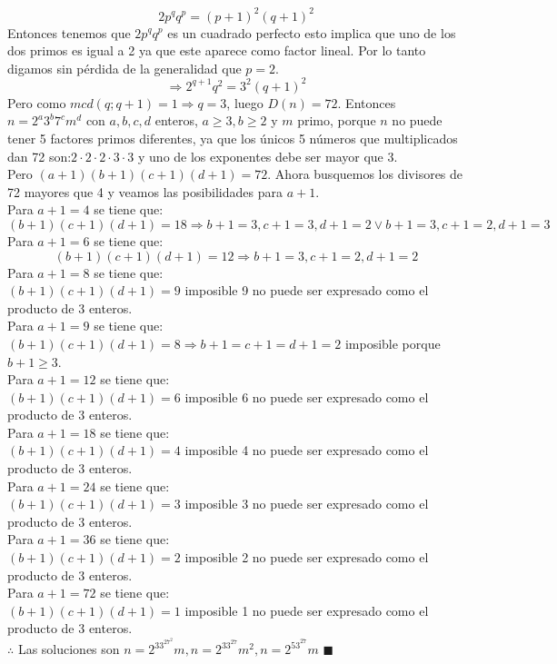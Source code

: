 \documentclass{book}
\begin{document}
\begin{enumerate}
$$2 p^qq^p = {(p + 1)}^2{(q + 1)}^2$$
 Entonces tenemos que $2 p^qq^p$ es un cuadrado perfecto esto implica  que uno de los dos primos es igual a 2 ya que este aparece como factor lineal. Por lo tanto digamos sin pérdida de la generalidad que $p= 2$.   
 $$\Rightarrow 2^{q+1}q^2 = 3^2(q + 1)^2$$ 
 Pero como $mcd(q;q + 1) = 1 \Rightarrow q = 3$, luego $D(n) = 72$. Entonces $n = 2^a3^b7^cm^d$ con $a,b,c,d$ enteros, $a \geq 3 ,b\geq  2$ y $m$ primo, porque $n$ no puede tener 5 factores primos diferentes, ya que los únicos 5 números que multiplicados dan 72 son:$2\cdot 2\cdot 2\cdot 3\cdot 3$ y uno de los exponentes debe ser mayor que 3. \\
Pero $(a + 1)(b + 1)(c + 1)(d + 1) = 72$. Ahora busquemos los divisores de 72 mayores que 4 y veamos las posibilidades para $a + 1$.\\ 
Para $a + 1 = 4$ se tiene que: 
$$(b + 1)(c + 1)(d + 1) = 18 \Rightarrow b + 1 = 3,c + 1 = 3,d + 1 = 2 
\vee  b + 1 = 3,c + 1 = 2,d + 1 = 3$$ 
Para $a + 1 = 6$ se tiene que: 
$$(b + 1)(c + 1)(d + 1) = 12 \Rightarrow b + 1 = 3,c + 1 = 2,d + 1 = 2$$ 
Para $a + 1 = 8$ se tiene que:\\ 
$(b + 1)(c + 1)(d + 1) = 9$ imposible 9 no puede ser expresado como el producto de 3 enteros.\\ 
Para $a + 1 = 9$ se tiene que: \\
$(b + 1)(c + 1)(d + 1) = 8 \Rightarrow b + 1 = c + 1 = d + 1 = 2$  imposible porque $b + 1 \geq 3$. \\
Para $a + 1 = 12$ se tiene que: \\
$(b + 1)(c + 1)(d + 1) = 6$ imposible 6 no puede ser expresado como el producto de 3 enteros. \\
Para $a + 1 = 18$ se tiene que: \\
$(b + 1)(c + 1)(d + 1) = 4$ imposible 4 no puede ser expresado como el producto de 3 enteros.\\ 
Para $a + 1 = 24$ se tiene que: \\
$(b + 1)(c + 1)(d + 1) = 3$ imposible 3 no puede ser expresado como el producto de 3 enteros.\\ 
Para $a + 1 = 36$ se tiene que: \\
$(b + 1)(c + 1)(d + 1) = 2$ imposible 2 no puede ser expresado como el producto de 3 enteros.\\ 
Para $a + 1 = 72$ se tiene que: \\
$(b + 1)(c + 1)(d + 1) = 1$ imposible 1 no puede ser expresado como el producto de 3 enteros. \\
$\therefore$ Las soluciones son $n= 2^33^27^2m , n= 2^33^27m^2, n= 2^53^27m$ $\blacksquare$\\

\end{enumerate}
\end{document}
